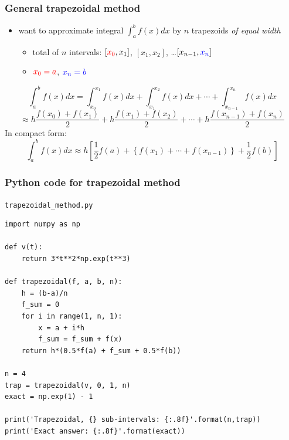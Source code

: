 \documentclass[english,14pt]{beamer}
\newcommand\red[1]{{\color{red} #1}}
\newcommand\blue[1]{{\color{blue} #1}}
\begin{document}
\begin{frame}[fragile]

\frametitle{General trapezoidal method}

\begin{itemize}
	\item want to approximate integral $\int_a^b f(x)dx$ by $n$ trapezoids \emph{of equal width}
	\begin{itemize}
		\item total of $n$ intervals: $[\red{x_0},x_1]$, $[x_1,x_2]$, \ldots $[x_{n-1},\blue{x_n}]$
		\item $\red{x_0 = a}$, $\blue{x_n = b}$
	\end{itemize}
\end{itemize}

{\small
\[
\int_a^b f(x)dx = \int_{x_0}^{x_1} f(x)dx + \int_{x_1}^{x_2} f(x)dx + \cdots + \int_{x_{n-1}}^{x_n} f(x)dx
\]
\pause
\[
\approx h\frac{f(x_0)+f(x_1)}{2} + h\frac{f(x_1)+f(x_2)}{2} + \cdots + h\frac{f(x_{n-1}) + f(x_n)}{2}
\]
\pause
In compact form:
\[
\boxed{
\int_a^b f(x)dx \approx h \left[ \frac{1}{2}f(a) + \left\{ f(x_1)+\cdots+f(x_{n-1}) \right\} + \frac{1}{2}f(b) \right]}
\]
}

\end{frame}


\begin{frame}[fragile]

\frametitle{Python code for trapezoidal method}

\texttt{trapezoidal\_method.py}
\begin{lstlisting}[style=CStyle,basicstyle=\scriptsize]
import numpy as np

def v(t):
    return 3*t**2*np.exp(t**3)

def trapezoidal(f, a, b, n):
    h = (b-a)/n
    f_sum = 0
    for i in range(1, n, 1):
        x = a + i*h
        f_sum = f_sum + f(x)
    return h*(0.5*f(a) + f_sum + 0.5*f(b))

n = 4
trap = trapezoidal(v, 0, 1, n)
exact = np.exp(1) - 1

print('Trapezoidal, {} sub-intervals: {:.8f}'.format(n,trap))
print('Exact answer: {:.8f}'.format(exact))
\end{lstlisting}

\end{frame}

\end{document}
